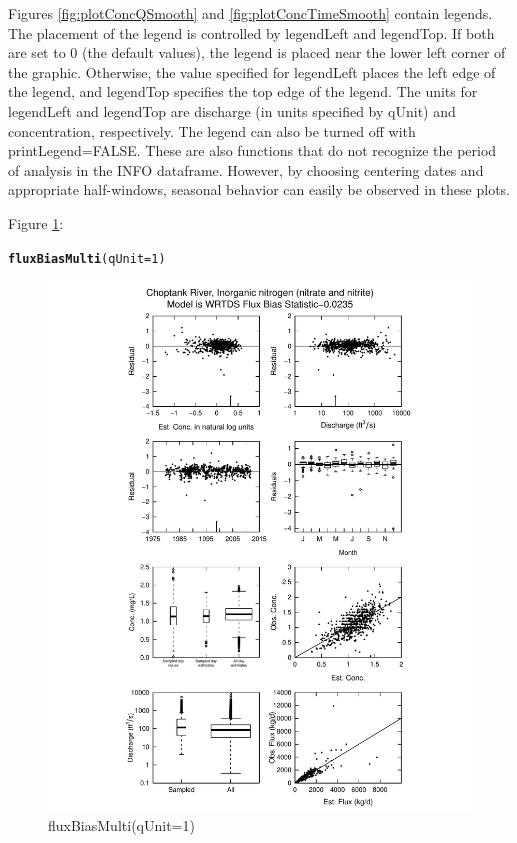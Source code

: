 \documentclass[a4paper,11pt]{article}\usepackage[]{graphicx}\usepackage[]{color}
\makeatletter
\def\maxwidth{ %
  \ifdim\Gin@nat@width>\linewidth
    \linewidth
  \else
    \Gin@nat@width
  \fi
}
\newcommand{\hlnum}[1]{\textcolor[rgb]{0.686,0.059,0.569}{#1}}%
\newcommand{\hlstd}[1]{\textcolor[rgb]{0.345,0.345,0.345}{#1}}%
\newcommand{\hlkwc}[1]{\textcolor[rgb]{0.333,0.667,0.333}{#1}}%
\newcommand{\hlkwd}[1]{\textcolor[rgb]{0.737,0.353,0.396}{\textbf{#1}}}%
\newenvironment{kframe}{%
 \def\at@end@of@kframe{}%
 \ifinner\ifhmode%
  \def\at@end@of@kframe{\end{minipage}}%
  \begin{minipage}{\columnwidth}%
 \fi\fi%
 \def\FrameCommand##1{\hskip\@totalleftmargin \hskip-\fboxsep
 \colorbox{shadecolor}{##1}\hskip-\fboxsep
     \hskip-\linewidth \hskip-\@totalleftmargin \hskip\columnwidth}%
 \MakeFramed {\advance\hsize-\width
   \@totalleftmargin\z@ \linewidth\hsize
   \@setminipage}}%
 {\par\unskip\endMakeFramed%
 \at@end@of@kframe}
\newenvironment{knitrout}{}{} %
\makeatother
\begin{document}
Figures \ref{fig:plotConcQSmooth} and \ref{fig:plotConcTimeSmooth} contain legends. The placement of the legend is controlled by legendLeft and legendTop. If both are set to 0 (the default values), the legend is placed near the lower left corner of the graphic. Otherwise, the value specified for legendLeft places the left edge of the legend, and legendTop specifies the top edge of the legend. The units for legendLeft and legendTop are discharge (in units specified by qUnit) and concentration, respectively. The legend can also be turned off with printLegend=FALSE. These are also functions that do not recognize the period of analysis in the INFO dataframe. However, by choosing centering dates and appropriate half-windows, seasonal behavior can easily be observed in these plots. 


Figure \ref{fig:fluxBiasMulti}:
\begin{knitrout}
\color{fgcolor}\begin{kframe}
\begin{alltt}
\hlkwd{fluxBiasMulti}\hlstd{(}\hlkwc{qUnit}\hlstd{=}\hlnum{1}\hlstd{)}
\end{alltt}
\end{kframe}\begin{figure}[]

\includegraphics[width=\maxwidth]{figure/fluxBiasMulti} \caption[fluxBiasMulti(qUnit=1)]{fluxBiasMulti(qUnit=1)\label{fig:fluxBiasMulti}}
\end{figure}


\end{knitrout}
\end{document}
